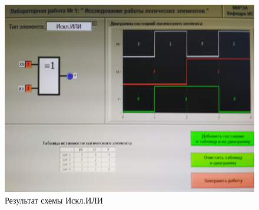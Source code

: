 \begin{figure}[H]
	\centering
	\includegraphics[width=0.85\linewidth]{imgs/1/xor}
	\caption{Результат схемы Искл.ИЛИ}
	\label{fig:1_xor}
\end{figure}

